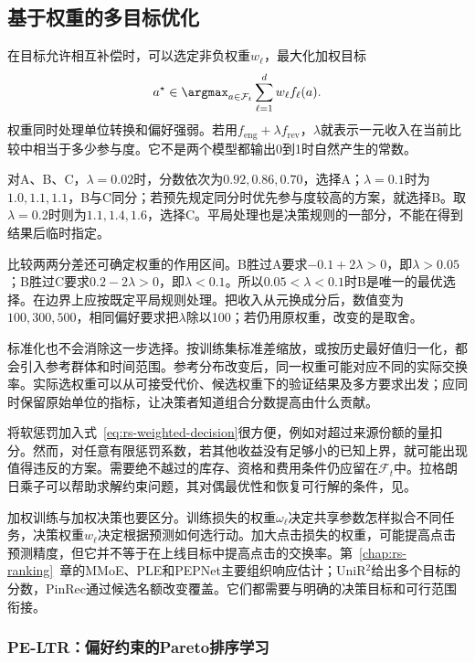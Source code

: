 \subsection{基于权重的多目标优化}
\label{sec:rs-weighted-objectives}

在目标允许相互补偿时，可以选定非负权重$w_\ell$，最大化加权目标
\begin{equation}
 a^\star\in\argmax_{a\in\mathcal{F}_t}
     \sum_{\ell=1}^{d}w_\ell f_\ell(a).
 \label{eq:rs-weighted-decision}
\end{equation}
权重同时处理单位转换和偏好强弱。若用$f_{\mathrm{eng}}+\lambda f_{\mathrm{rev}}$，$\lambda$就表示一元收入在当前比较中相当于多少参与度。它不是两个模型都输出0到1时自然产生的常数。

对A、B、C，$\lambda=0.02$时，分数依次为$0.92,0.86,0.70$，选择A；$\lambda=0.1$时为$1.0,1.1,1.1$，B与C同分；若预先规定同分时优先参与度较高的方案，就选择B。取$\lambda=0.2$时则为$1.1,1.4,1.6$，选择C。平局处理也是决策规则的一部分，不能在得到结果后临时指定。

比较两两分差还可确定权重的作用区间。B胜过A要求$-0.1+2\lambda>0$，即$\lambda>0.05$；B胜过C要求$0.2-2\lambda>0$，即$\lambda<0.1$。所以$0.05<\lambda<0.1$时B是唯一的最优选择。在边界上应按既定平局规则处理。把收入从元换成分后，数值变为$100,300,500$，相同偏好要求把$\lambda$除以100；若仍用原权重，改变的是取舍。

标准化也不会消除这一步选择。按训练集标准差缩放，或按历史最好值归一化，都会引入参考群体和时间范围。参考分布改变后，同一权重可能对应不同的实际交换率。实际选权重可以从可接受代价、候选权重下的验证结果及多方要求出发；应同时保留原始单位的指标，让决策者知道组合分数提高由什么贡献。

将软惩罚加入式~\eqref{eq:rs-weighted-decision}很方便，例如对超过来源份额的量扣分。然而，对任意有限惩罚系数，若其他收益没有足够小的已知上界，就可能出现值得违反的方案。需要绝不越过的库存、资格和费用条件仍应留在$\mathcal{F}_t$中。拉格朗日乘子可以帮助求解约束问题，其对偶最优性和恢复可行解的条件，见。

加权训练与加权决策也要区分。训练损失的权重$\omega_\ell$决定共享参数怎样拟合不同任务，决策权重$w_\ell$决定根据预测如何选行动。加大点击损失的权重，可能提高点击预测精度，但它并不等于在上线目标中提高点击的交换率。第~\ref{chap:rs-ranking}~章的MMoE、PLE和PEPNet主要组织响应估计；UniR$^2$给出多个目标的分数，PinRec通过候选名额改变覆盖。它们都需要与明确的决策目标和可行范围衔接。

\subsubsection{PE-LTR：偏好约束的Pareto排序学习}
\label{sec:rs-pe-ltr}

